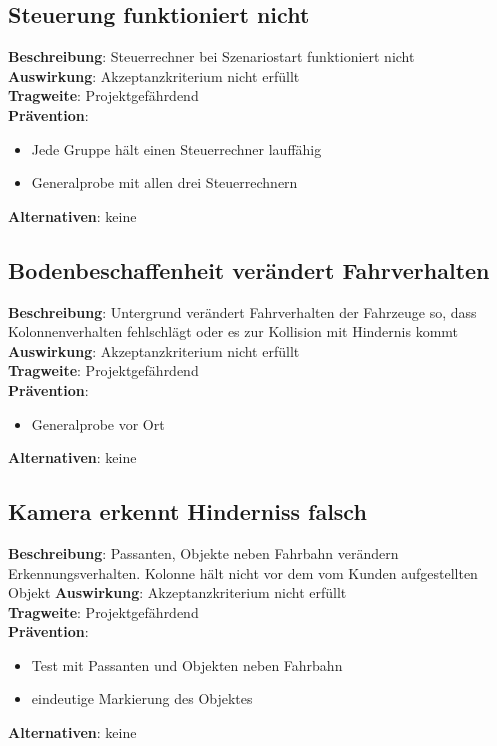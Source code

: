 \documentclass[a4paper, 12pt, titlepage]{scrartcl}
\begin{document}
	\subsection{Steuerung funktioniert nicht}
		\textbf{Beschreibung}: Steuerrechner bei Szenariostart funktioniert nicht\\
		\textbf{Auswirkung}: Akzeptanzkriterium nicht erfüllt\\
		\textbf{Tragweite}: Projektgefährdend\\
		\textbf{Prävention}:		
		\begin{itemize}
			\item Jede Gruppe hält einen Steuerrechner lauffähig
			\item Generalprobe mit allen drei Steuerrechnern
		\end{itemize}
		\textbf{Alternativen}: keine

	\subsection{Bodenbeschaffenheit verändert Fahrverhalten}
		\textbf{Beschreibung}: Untergrund verändert Fahrverhalten der Fahrzeuge so, dass Kolonnenverhalten fehlschlägt oder es zur Kollision mit Hindernis kommt\\
		\textbf{Auswirkung}: Akzeptanzkriterium nicht erfüllt\\
		\textbf{Tragweite}: Projektgefährdend\\
		\textbf{Prävention}:
		\begin{itemize}
			\item Generalprobe vor Ort
		\end{itemize}
		\textbf{Alternativen}: keine

	\subsection{Kamera erkennt Hinderniss falsch}
		\textbf{Beschreibung}: Passanten, Objekte neben Fahrbahn verändern Erkennungsverhalten. Kolonne hält nicht vor dem vom Kunden aufgestellten Objekt
		\textbf{Auswirkung}: Akzeptanzkriterium nicht erfüllt\\
		\textbf{Tragweite}: Projektgefährdend\\
		\textbf{Prävention}:
		\begin{itemize}
			\item Test mit Passanten und Objekten neben Fahrbahn
			\item eindeutige Markierung des Objektes
		\end{itemize}
		\textbf{Alternativen}: keine
\end{document}
